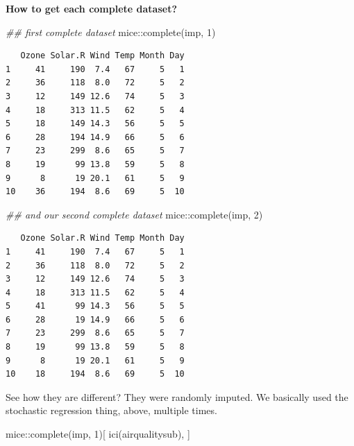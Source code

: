 \documentclass[
  letterpaper,
  DIV=11,
  numbers=noendperiod]{scrreprt}
\newenvironment{Shaded}{\begin{snugshade}}{\end{snugshade}}
\newcommand{\DecValTok}[1]{\textcolor[rgb]{0.25,0.63,0.44}{#1}}
\newcommand{\DocumentationTok}[1]{\textcolor[rgb]{0.73,0.13,0.13}{\textit{#1}}}
\newcommand{\FunctionTok}[1]{\textcolor[rgb]{0.02,0.16,0.49}{#1}}
\newcommand{\NormalTok}[1]{\textcolor[rgb]{0.00,0.44,0.13}{#1}}
\newcommand{\SpecialCharTok}[1]{\textcolor[rgb]{0.25,0.44,0.63}{#1}}
\begin{document}
\textbf{How to get each complete dataset?}

\begin{Shaded}
\begin{Highlighting}[]
\DocumentationTok{\#\# first complete dataset }
\NormalTok{  mice}\SpecialCharTok{::}\FunctionTok{complete}\NormalTok{(imp, }\DecValTok{1}\NormalTok{)}
\end{Highlighting}
\end{Shaded}

\begin{verbatim}
   Ozone Solar.R Wind Temp Month Day
1     41     190  7.4   67     5   1
2     36     118  8.0   72     5   2
3     12     149 12.6   74     5   3
4     18     313 11.5   62     5   4
5     18     149 14.3   56     5   5
6     28     194 14.9   66     5   6
7     23     299  8.6   65     5   7
8     19      99 13.8   59     5   8
9      8      19 20.1   61     5   9
10    36     194  8.6   69     5  10
\end{verbatim}

\begin{Shaded}
\begin{Highlighting}[]
\DocumentationTok{\#\# and our second complete dataset}
\NormalTok{  mice}\SpecialCharTok{::}\FunctionTok{complete}\NormalTok{(imp, }\DecValTok{2}\NormalTok{)}
\end{Highlighting}
\end{Shaded}

\begin{verbatim}
   Ozone Solar.R Wind Temp Month Day
1     41     190  7.4   67     5   1
2     36     118  8.0   72     5   2
3     12     149 12.6   74     5   3
4     18     313 11.5   62     5   4
5     41      99 14.3   56     5   5
6     28      19 14.9   66     5   6
7     23     299  8.6   65     5   7
8     19      99 13.8   59     5   8
9      8      19 20.1   61     5   9
10    18     194  8.6   69     5  10
\end{verbatim}

See how they are different? They were randomly imputed. We basically
used the stochastic regression thing, above, multiple times.

\begin{Shaded}
\begin{Highlighting}[]
\NormalTok{  mice}\SpecialCharTok{::}\FunctionTok{complete}\NormalTok{(imp, }\DecValTok{1}\NormalTok{)[ }\FunctionTok{ici}\NormalTok{(airqualitysub), ]}
\end{Highlighting}
\end{Shaded}
\end{document}
